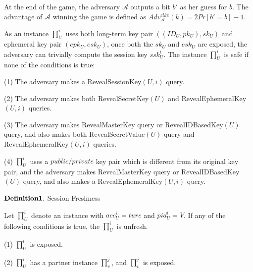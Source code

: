 \documentclass[final,1p,times,twocolumn]{elsarticle}
\begin{document}
\vspace{0.2cm}

At the end of the game, the adversary $\mathcal{A}$ outputs a bit $b'$ as her guess for $b$. The advantage of $\mathcal{A}$ winning the game is defined as $Adv_{\mathcal{A}}^{clke}(k)=2Pr[b'=b]-1$.

As an instance $\prod_{U}^{i}$ uses both  long-term key pair $((ID_{U},pk_{U}),sk_{U})$ and ephemeral key pair $(epk_{U},esk_{U})$, once both the $sk_{U}$ and $esk_{U}$ are exposed, the adversary can trivially compute the session key $ssk_{U}^{i}$. The instance $\prod_{U}^{i}$ is safe if none of the conditions is true:

\vspace{0.1cm}

(1) The adversary makes a RevealSessionKey$(U,i)$ query.

\vspace{0.1cm}

(2) The adversary makes both RevealSecretKey$(U)$ and RevealEphemeralKey$(U,i)$ queries.

\vspace{0.1cm}

(3) The adversary makes RevealMasterKey query or RevealIDBasedKey$(U)$ query, and also makes both RevealSecretValue$(U)$ query and RevealEphemeralKey$(U,i)$ queries.

\vspace{0.1cm}

(4) $\prod_{U}^{i}$ uses a $public/private$ key pair which is different from its original key pair, and the adversary makes RevealMasterKey query or RevealIDBasedKey$(U)$ query, and also makes a RevealEphemeralKey$(U,i)$ query.

\vspace{0.2cm}

\noindent$\displaystyle {\bf Definition 1.} $  Session  Freshness

\vspace{0.1cm}

Let $\prod_{U}^{i}$ denote an instance with $acc_{U}^{i}=ture$ and $pid_{U}^{i}=V$. If any of the following conditions is true, the $\prod_{U}^{i}$ is unfresh.

\vspace{0.1cm}

(1) $\prod_{U}^{i}$ is exposed.

\vspace{0.1cm}

(2) $\prod_{U}^{i}$ has a partner instance $\prod_{v}^{j}$, and $\prod_{v}^{j}$ is exposed.
\end{document}
